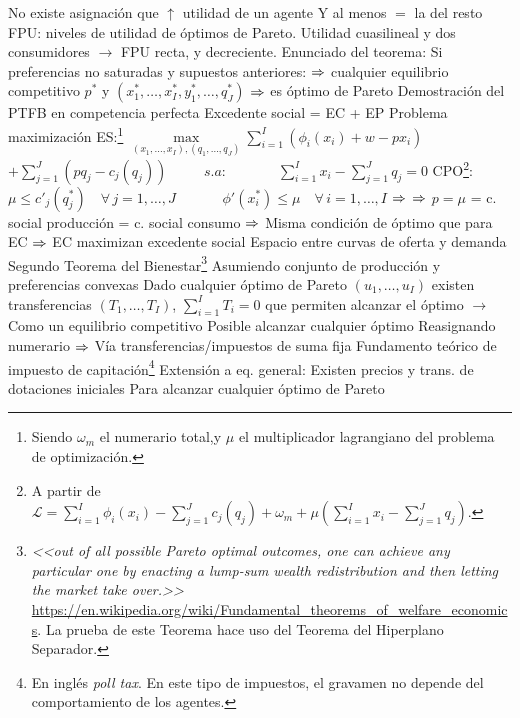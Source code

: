 \documentclass{nuevotema}
\begin{document}
\begin{esquemal}
				\4[] No existe asignación que $\uparrow$ utilidad de un agente
				\4[] Y al menos $=$ la del resto
				\4 FPU: niveles de utilidad de óptimos de Pareto.
				\4 Utilidad cuasilineal y dos consumidores
				\4[] $\to$ FPU recta, y decreciente.
				\4[] 
				\4 Enunciado del teorema:
				\4[] Si preferencias no saturadas y supuestos anteriores:
				\4[] $\then$ cualquier equilibrio competitivo $p^*$ y $(x^*_1, \ldots, x^*_I, y^*_1, \ldots, q^*_J)$
				\4[] $\then$ es óptimo de Pareto
				\4 Demostración del PTFB en competencia perfecta
				\4[] Excedente social = EC + EP
				\4[] Problema maximización ES:\footnote{Siendo $\omega_m$ el numerario total,y $\mu$ el multiplicador lagrangiano del problema de optimización.}
				\4[] $\underset{(x_1, \ldots , x_I), (q_1, \ldots , q_J)}{\max} \sum_{i=1}^I \left( \phi_i(x_i) + w - p x_i \right)$
				\4[] \quad \quad \quad \quad \quad \quad \quad  $+ \sum_{j=1}^J \left( p q_j - c_j (q_j) \right)$
				\4[] $\quad \; \quad s.a: \quad \quad \; \; \quad \sum_{i=1}^I x_i - \sum_{j=1}^J q_j = 0$
				\4[] CPO\footnote{A partir de $\mathcal{L} = \sum_{i=1}^I \phi_i(x_i) - \sum_{j=1}^J c_j (q_j) + \omega_m + \mu \left( \sum_{i=1}^I x_i - \sum_{j=1}^J q_j \right)$.}: $\mu \leq c'_j(q_j^*) \quad \forall \, j=1, \ldots, J$
				\4[] $\quad \quad \quad \phi'(x_i^*) \leq \mu \quad \forall \, i=1, \ldots, I$
				\4[] $\then$ 
				\4[] $\then$ $p=\mu$ = c. social producción = c. social consumo
				\4[] $\then$ Misma condición de óptimo que para EC
				\4[] $\then$ EC maximizan excedente social
				\4[] Espacio entre curvas de oferta y demanda
				\4[] 
			\3 {Segundo Teorema del Bienestar}\footnote{\textit{<<out of all possible Pareto optimal outcomes, one can achieve any particular one by enacting a lump-sum wealth redistribution and then letting the market take over.>>} \url{https://en.wikipedia.org/wiki/Fundamental_theorems_of_welfare_economics}. La prueba de este Teorema hace uso del Teorema del Hiperplano Separador.}
				\4 Asumiendo conjunto de producción y preferencias convexas
				\4 Dado cualquier óptimo de Pareto $(u_1, \ldots, u_I)$
				\4[] existen transferencias $(T_1, \ldots, T_I)$, $\sum_{i=1}^I T_i = 0$
				\4[] que permiten alcanzar el óptimo
				\4[] $\to$ Como un equilibrio competitivo
				\4 Posible alcanzar cualquier óptimo
				\4[] Reasignando numerario
				\4[] $\then$ Vía transferencias/impuestos de suma fija
				\4[$\then$] Fundamento teórico de impuesto de capitación\footnote{En inglés \textit{poll tax}. En este tipo de impuestos, el gravamen no depende del comportamiento de los agentes.}
				\4 Extensión a eq. general:
				\4 [] Existen precios y trans. de dotaciones iniciales
				\4 [] Para alcanzar cualquier óptimo de Pareto


\end{esquemal}
\end{document}
